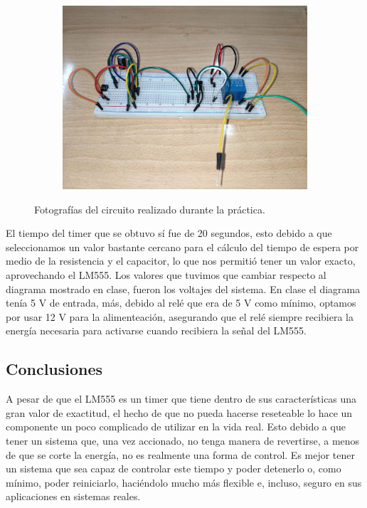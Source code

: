 \begin{figure}[htb]
\begin{subfigure}[htb]{0.45\textwidth}
        \caption{}
    \end{subfigure}
    \centering
    \begin{subfigure}[htb]{0.45\textwidth}
        \centering
        \includegraphics[width=\textwidth]{media/circuito_real_1}
        \caption{}
    \end{subfigure}
    \caption{Fotografías del circuito realizado durante la práctica.}
    \label{Fig: Fotografias del circuito realizado durante la practica}
\end{figure}

El tiempo del timer que se obtuvo sí fue de 20 segundos, esto debido a que seleccionamos un valor bastante cercano para el cálculo del tiempo de espera por medio de la resistencia y el capacitor, lo que nos permitió tener un valor exacto, aprovechando el LM555. Los valores que tuvimos que cambiar respecto al diagrama mostrado en clase, fueron los voltajes del sistema. En clase el diagrama tenía 5 V de entrada, más, debido al relé que era de 5 V como mínimo, optamos por usar 12 V para la alimenteación, asegurando que el relé siempre recibiera la energía necesaria para activarse cuando recibiera la señal del LM555.

\subsection{Conclusiones}

A pesar de que el LM555 es un timer que tiene dentro de sus características una gran valor de exactitud, el hecho de que no pueda hacerse reseteable lo hace un componente un poco complicado de utilizar en la vida real. Esto debido a que tener un sistema que, una vez accionado, no tenga manera de revertirse, a menos de que se corte la energía, no es realmente una forma de control. Es mejor tener un sistema que sea capaz de controlar este tiempo y poder detenerlo o, como mínimo, poder reiniciarlo, haciéndolo mucho más flexible e, incluso, seguro en sus aplicaciones en sistemas reales.

